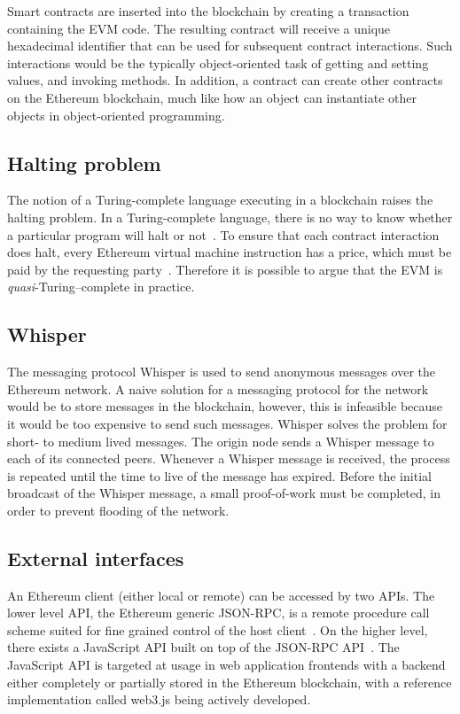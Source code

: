Smart contracts are inserted into the blockchain by creating a transaction containing the EVM code. The resulting contract will receive a unique hexadecimal identifier that can be used for subsequent contract interactions. Such interactions would be the typically object-oriented task of getting and setting values, and invoking methods. In addition, a contract can create other contracts on the Ethereum blockchain, much like how an object can instantiate other objects in object-oriented programming.

\subsection{Halting problem}
\label{sec:tech:halting}
The notion of a Turing-complete language executing in a blockchain raises the halting problem. In a Turing-complete language, there is no way to know whether a particular program will halt or not~\cite{hopcroft}. To ensure that each contract interaction does halt, every Ethereum virtual machine instruction has a price, which must be paid by the requesting party~\cite{ethereum:yellow}. Therefore it is possible to argue that the EVM is \emph{quasi}-Turing--complete in practice.

\subsection{Whisper}
The messaging protocol Whisper is used to send anonymous messages over the Ethereum network. A naive solution for a messaging protocol for the network would be to store messages in the blockchain, however, this is infeasible because it would be too expensive to send such messages. Whisper solves the problem for short- to medium lived messages. The origin node sends a Whisper message to each of its connected peers. Whenever a Whisper message is received, the process is repeated until the time to live of the message has expired. Before the initial broadcast of the Whisper message, a small proof-of-work must be completed, in order to prevent flooding of the network.

\subsection{External interfaces}
An Ethereum client (either local or remote) can be accessed by two APIs. The lower level API, the Ethereum generic JSON-RPC, is a remote procedure call scheme suited for fine grained control of the host client~\cite{generic-json-rpc}. On the higher level, there exists a JavaScript API built on top of the JSON-RPC API~\cite{javascript-api}. The JavaScript API is targeted at usage in web application frontends with a backend either completely or partially stored in the Ethereum blockchain, with a reference implementation called web3.js being actively developed.

